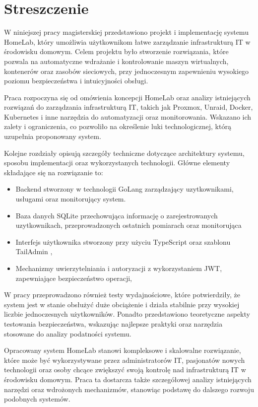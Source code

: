 \documentclass[a4paper,12pt]{report}
\begin{document}


\section*{Streszczenie}

W niniejszej pracy magisterskiej przedstawiono projekt i implementację systemu HomeLab, który umożliwia użytkownikom łatwe zarządzanie infrastrukturą IT w środowisku domowym. Celem projektu było stworzenie rozwiązania, które pozwala na automatyczne wdrażanie i kontrolowanie maszyn wirtualnych, kontenerów oraz zasobów sieciowych, przy jednoczesnym zapewnieniu wysokiego poziomu bezpieczeństwa i intuicyjności obsługi.

Praca rozpoczyna się od omówienia koncepcji HomeLab oraz analizy istniejących rozwiązań do zarządzania infrastrukturą IT, takich jak Proxmox, Unraid, Docker, Kubernetes i inne narzędzia do automatyzacji oraz monitorowania. Wskazano ich zalety i ograniczenia, co pozwoliło na określenie luki technologicznej, którą uzupełnia proponowany system.

Kolejne rozdziały opisują szczegóły techniczne dotyczące architektury systemu, sposobu implementacji oraz wykorzystanych technologii. Główne elementy składające się na rozwiązanie to:
\begin{itemize}
    \item Backend stworzony w technologii GoLang zarządzający uzytkownikami, usługami oraz monitorujący system.
    \item Baza danych SQLite przechowująca informację o zarejestrowanych uzytkownikach, przeprowadzonych ostatnich pomiarach oraz monitorująca
    \item Interfejs użytkownika stworzony przy użyciu TypeScript oraz szablonu TailAdmin \cite{TailAdmin},
    \item Mechanizmy uwierzytelniania i autoryzacji z wykorzystaniem JWT, zapewniające bezpieczeństwo operacji,
\end{itemize}

W pracy przeprowadzono również testy wydajnościowe, które potwierdziły, że system jest w stanie obsłużyć duże obciążenie i działa stabilnie przy wysokiej liczbie jednoczesnych użytkowników. Ponadto przedstawiono teoretyczne aspekty testowania bezpieczeństwa, wskazując najlepsze praktyki oraz narzędzia stosowane do analizy podatności systemu.

Opracowany system HomeLab stanowi kompleksowe i skalowalne rozwiązanie, które może być wykorzystywane przez administratorów IT, pasjonatów nowych technologii oraz osoby chcące zwiększyć swoją kontrolę nad infrastrukturą IT w środowisku domowym. Praca ta dostarcza także szczegółowej analizy istniejących narzędzi oraz wdrożonych mechanizmów, stanowiąc podstawę do dalszego rozwoju podobnych systemów.
\end{document}
